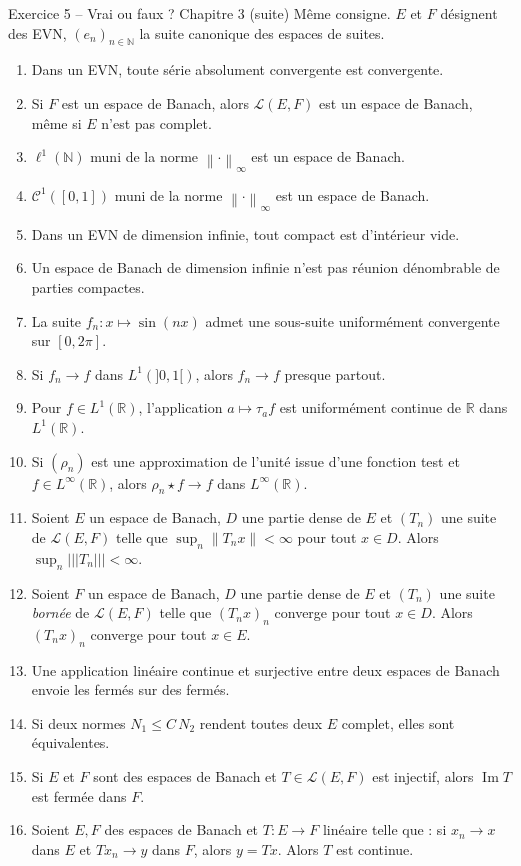 \documentclass[11pt,a4paper]{article}
\newcommand{\R}{\mathbb{R}}
\newcommand{\N}{\mathbb{N}}
\newcommand{\norm}[1]{\left\|#1\right\|}
\newcommand{\opnorm}[1]{|\!|\!|#1|\!|\!|}
\newcommand{\Lc}{\mathcal{L}}
\DeclareMathOperator{\Ima}{Im}
\theoremstyle{definition}
\begin{document}
\begin{exo}{Exercice 5 -- Vrai ou faux ? Chapitre 3 (suite)}
Même consigne. $E$ et $F$ désignent des EVN, $(e_n)_{n\in\N}$ la suite canonique des espaces de suites.
\begin{enumerate}[label=\arabic*.]
  \item Dans un EVN, toute série absolument convergente est convergente.
  \item Si $F$ est un espace de Banach, alors $\Lc(E,F)$ est un espace de Banach, même si $E$ n'est pas complet.
  \item $\ell^1(\N)$ muni de la norme $\norm\cdot_\infty$ est un espace de Banach.
  \item $\mathcal C^1([0,1])$ muni de la norme $\norm\cdot_\infty$ est un espace de Banach.
  \item Dans un EVN de dimension infinie, tout compact est d'intérieur vide.
  \item Un espace de Banach de dimension infinie n'est pas réunion dénombrable de parties compactes.
  \item La suite $f_n:x\mapsto\sin(nx)$ admet une sous-suite uniformément convergente sur $[0,2\pi]$.
  \item Si $f_n\to f$ dans $L^1(]0,1[)$, alors $f_n\to f$ presque partout.
  \item Pour $f\in L^1(\R)$, l'application $a\mapsto\tau_af$ est uniformément continue de $\R$ dans $L^1(\R)$.
  \item Si $(\rho_n)$ est une approximation de l'unité issue d'une fonction test et $f\in L^\infty(\R)$, alors $\rho_n\star f\to f$ dans $L^\infty(\R)$.
  \item Soient $E$ un espace de Banach, $D$ une partie dense de $E$ et $(T_n)$ une suite de $\Lc(E,F)$ telle que $\sup_n\norm{T_nx}<\infty$ pour tout $x\in D$. Alors $\sup_n\opnorm{T_n}<\infty$.
  \item Soient $F$ un espace de Banach, $D$ une partie dense de $E$ et $(T_n)$ une suite \emph{bornée} de $\Lc(E,F)$ telle que $(T_nx)_n$ converge pour tout $x\in D$. Alors $(T_nx)_n$ converge pour tout $x\in E$.
  \item Une application linéaire continue et surjective entre deux espaces de Banach envoie les fermés sur des fermés.
  \item Si deux normes $N_1\le C\,N_2$ rendent toutes deux $E$ complet, elles sont équivalentes.
  \item Si $E$ et $F$ sont des espaces de Banach et $T\in\Lc(E,F)$ est injectif, alors $\Ima T$ est fermée dans $F$.
  \item Soient $E,F$ des espaces de Banach et $T:E\to F$ linéaire telle que : si $x_n\to x$ dans $E$ et $Tx_n\to y$ dans $F$, alors $y=Tx$. Alors $T$ est continue.
\end{enumerate}
\end{exo}
\end{document}
